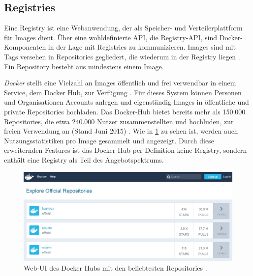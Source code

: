 \documentclass[../main.tex]{subfiles}
\begin{document}
		\subsection{Registries}
		\label{dockerRegistries}
      Eine Registry ist eine Webanwendung, der als Speicher- und Verteilerplattform für Images dient. Über eine wohldefinierte API, die Registry-API, sind Docker-Komponenten in der Lage mit Registries zu kommunizieren. Images sind mit Tags versehen in Repositories gegliedert, die wiederum in der Registry liegen \cite{dockerRegistry}. Ein Repository besteht aus mindestens einem Image.

      \emph{Docker} stellt eine Vielzahl an Images öffentlich und frei verwendbar in einem Service, dem Docker Hub, zur Verfügung \cite[S.11]{dockerBook}\cite[S.3]{dockerSec1}\cite{dockerRegistry}. Für dieses System können Personen und Organisationen Accounts anlegen und eigenständig Images in öffentliche und private Repositories hochladen. Das Docker-Hub bietet bereits mehr als 150.000 Repositories, die etwa 240.000 Nutzer zusammenstellten und hochluden, zur freien Verwendung an (Stand Juni 2015) \cite[S.16]{slideshareDockercon15}. Wie in \fig \ref{fig:intro_registry} zu sehen ist, werden auch Nutzungsstatistiken pro Image gesammelt und angezeigt. Durch diese erweiternden Features ist das Docker Hub per Definition keine Registry, sondern enthält eine Registry als Teil des Angebotspektrums. %

      \begin{figure}[h]
          \centering
          \includegraphics[width=1.0\textwidth]{./images/intro_registry.jpg}
          \caption{Web-\acrshort{UI} des Docker Hubs mit den beliebtesten Repositories \cite{dockerHub}.}
          \label{fig:intro_registry}
      \end{figure}
\end{document}
